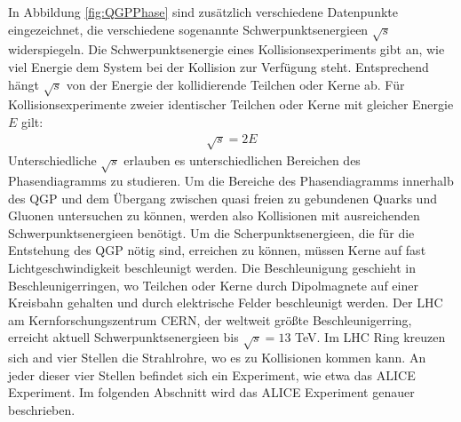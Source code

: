 In Abbildung \ref{fig:QGPPhase} sind zus\"atzlich verschiedene Datenpunkte eingezeichnet, die verschiedene sogenannte Schwerpunktsenergieen $\sqrt{s}$ widerspiegeln.
Die Schwerpunktsenergie eines Kollisionsexperiments gibt an, wie viel Energie dem System bei der Kollision zur Verf\"ugung steht.
Entsprechend h\"angt $\sqrt{s}$ von der Energie der kollidierende Teilchen oder Kerne ab.
F\"ur Kollisionsexperimente zweier identischer Teilchen oder Kerne mit gleicher Energie $E$ gilt:
\begin{align}
\sqrt{s} = 2E \label{eq:sqrts}
\end{align}
Unterschiedliche $\sqrt{s}$ erlauben es unterschiedlichen Bereichen des Phasendiagramms zu studieren.
Um die Bereiche des Phasendiagramms innerhalb des QGP und dem \"Ubergang zwischen quasi freien zu gebundenen Quarks und Gluonen untersuchen zu k\"onnen, werden also Kollisionen mit ausreichenden Schwerpunktsenergieen ben\"otigt.
\newline
Um die Scherpunktsenergieen, die f\"ur die Entstehung des QGP n\"otig sind, erreichen zu k\"onnen, m\"ussen Kerne auf fast Lichtgeschwindigkeit beschleunigt werden.
Die Beschleunigung geschieht in Beschleunigerringen, wo Teilchen oder Kerne durch Dipolmagnete auf einer Kreisbahn gehalten und durch elektrische Felder beschleunigt werden.
Der LHC am Kernforschungszentrum CERN, der weltweit gr\"o{\ss}te Beschleunigerring, erreicht aktuell Schwerpunktsenergieen bis $\sqrt{s} = 13$ TeV.
Im LHC Ring kreuzen sich and vier Stellen die Strahlrohre, wo es zu Kollisionen kommen kann.
An jeder dieser vier Stellen befindet sich ein Experiment, wie etwa das ALICE Experiment.
Im folgenden Abschnitt wird das ALICE Experiment genauer beschrieben.
